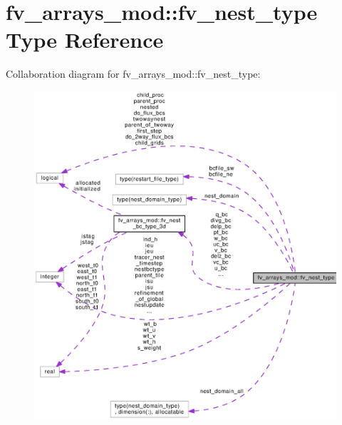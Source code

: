 \section{fv\-\_\-arrays\-\_\-mod\-:\-:fv\-\_\-nest\-\_\-type Type Reference}
\label{structfv__arrays__mod_1_1fv__nest__type}


Collaboration diagram for fv\-\_\-arrays\-\_\-mod\-:\-:fv\-\_\-nest\-\_\-type\-:
\nopagebreak
\begin{figure}[H]
\begin{center}
\leavevmode
\includegraphics[width=350pt]{structfv__arrays__mod_1_1fv__nest__type__coll__graph}
\end{center}
\end{figure}

